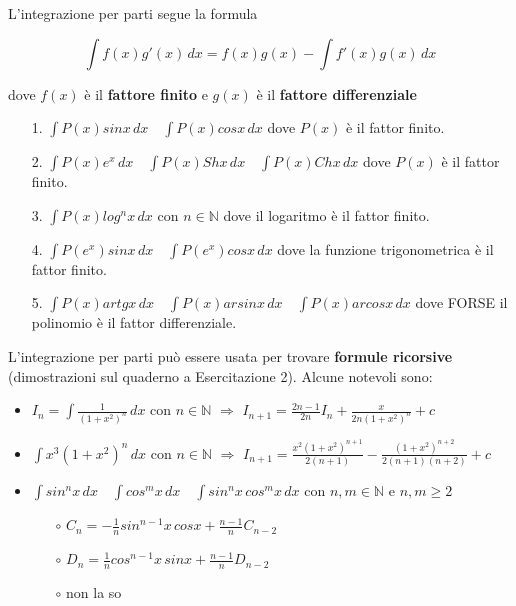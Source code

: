 \documentclass{article}
\theoremstyle{definition}
\theoremstyle{definition}
\theoremstyle{definition}
\theoremstyle{definition}
\theoremstyle{definition}
\begin{document}
L'integrazione per parti segue la formula 

\[
    \int f(x)g'(x)\, dx=f(x)g(x)- \int f'(x)g(x)\, dx
\]

dove $f(x)$ è il \textbf{fattore finito} e $g(x)$ è il \textbf{fattore differenziale}
\begin{itemize}
    \item [1.] $\displaystyle{\int P(x)sinx\,dx}\quad \displaystyle{\int P(x)cosx\,dx}$ dove $P(x)$ è il fattor finito.
    \item [2.] $\displaystyle{\int P(x)e^x\, dx} \quad \displaystyle{\int P(x)Shx\, dx} \quad \displaystyle{\int P(x)Chx\, dx}$ dove $P(x)$ è il fattor finito.
    \item [3.] $\displaystyle{\int P(x)log^nx\, dx}$ con $n\in\mathbb{N}$ dove il logaritmo è il fattor finito.
    \item [4.] $\displaystyle{\int P(e^x)sinx\,dx} \quad \displaystyle{\int P(e^x)cosx\,dx}$ dove la funzione trigonometrica è il fattor finito.
    \item [5.] $\displaystyle{\int P(x)artgx\, dx} \quad \displaystyle{\int P(x)arsinx\, dx} \quad \displaystyle{\int P(x)arcosx\, dx}$ dove FORSE il polinomio è il fattor differenziale.
\end{itemize}

L'integrazione per parti può essere usata per trovare \textbf{formule ricorsive} (dimostrazioni sul quaderno a Esercitazione 2). Alcune notevoli sono:
\begin{itemize}
    \item $\displaystyle{I_n=\int \frac{1}{(1+x^2)^n}\,dx}$ con $n\in\mathbb{N}$ $\Longrightarrow$ $\displaystyle{I_{n+1}= \frac{2n-1}{2n}I_n+\frac{x}{2n(1+x^2)^n}}+c$
    \item $\displaystyle{\int x^3 (1+x^2)^n\, dx}$ con $n\in\mathbb{N}$ $\Longrightarrow$ $\displaystyle{I_{n+1}=\frac{x^2(1+x^2)^{n+1}}{2(n+1)} - \frac{(1+x^2)^{n+2}}{2(n+1)(n+2)}}+c$
    \item $\displaystyle{\int sin^nx\,dx} \quad \displaystyle{\int cos^mx\,dx} \quad \displaystyle{\int sin^nx\,cos^mx\,dx}$ con $n,m\in\mathbb{N}$ e $n,m \geq 2$
    \begin{itemize}
        \item [$\circ$] $\displaystyle{C_n=-\frac{1}{n}sin^{n-1}x\,cosx+\frac{n-1}{n}C_{n-2}}$ 
        \item [$\circ$] $\displaystyle{D_n=\frac{1}{n}cos^{n-1}x\,sinx+\frac{n-1}{n}D_{n-2}}$
        \item [$\circ$] non la so
    \end{itemize}
\end{itemize}
\end{document}
